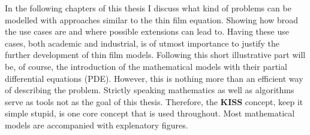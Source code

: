 In the following chapters of this thesis I discuss what kind of problems can be modelled with approaches similar to the thin film equation.
Showing how broad the use cases are and where possible extensions can lead to.
Having these use cases, both academic and industrial, is of utmost importance to justify the further development of thin film models. 
Following this short illustrative part will be, of course, the introduction of the mathematical models with their partial differential equations (PDE). 
However, this is nothing more than an efficient way of describing the problem.
Strictly speaking mathematics as well as algorithms serve as tools not as the goal of this thesis. 
Therefore, the \textbf{KISS} concept, keep it simple stupid, is one core concept that is used throughout.
Most mathematical models are accompanied with explenatory figures.        

